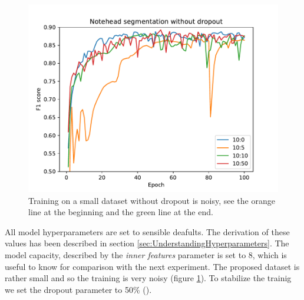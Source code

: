 \begin{figure}[ht]
    \centering
    \includegraphics[width=140mm]{../../figures/01-exploration-noteheads/noteheads.pdf}
    \caption{Training on a small dataset without dropout is noisy, see the orange line at the beginning and the green line at the end.}
    \label{fig:ExplorationNoteheadsNoDropout}
\end{figure}

All model hyperparameters are set to sensible deafults. The derivation of these values has been described in section \ref{sec:UnderstandingHyperparameters}. The model capacity, described by the \emph{inner features} parameter is set to 8, which is useful to know for comparison with the next experiment. The proposed dataset is rather small and so the training is very noisy (figure \ref{fig:ExplorationNoteheadsNoDropout}). To stabilize the trainig we set the dropout parameter to 50\% (\cite{Dropout}).

